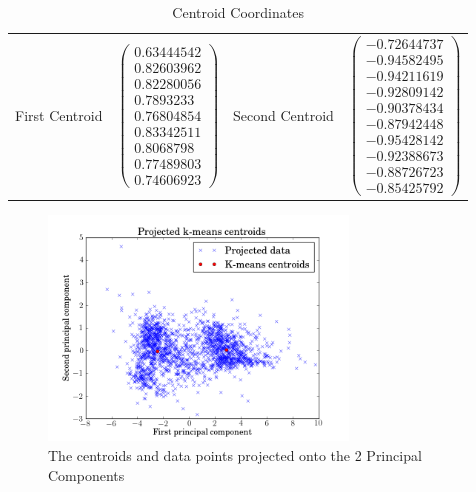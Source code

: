 \documentclass{article}
\theoremstyle{plain}
\theoremstyle{nonumberplain}
\begin{document}
\begin{table}[htb]
\centering
\caption{Centroid Coordinates}
\label{table:centroid}
\begin{tabular}{l|c||l|c}
	\hline \hline
	First Centroid & 
	$
	\begin{pmatrix}
		0.63444542 \\
		0.82603962 \\
		0.82280056 \\
		0.7893233 \\
		0.76804854 \\
		0.83342511 \\
		0.8068798 \\
		0.77489803 \\ 
		0.74606923 
	\end{pmatrix} $ 
	& Second Centroid & 
	$\begin{pmatrix}
		-0.72644737 \\
		-0.94582495 \\
		-0.94211619 \\
		-0.92809142 \\
		-0.90378434 \\
		-0.87942448 \\
		-0.95428142 \\
		-0.92388673 \\
		-0.88726723 \\
		-0.85425792
	\end{pmatrix}$
\end{tabular}
\end{table}

\begin{figure}[htb]
\centering
\includegraphics[height=6cm]{Images/Kmeans_PCA.png}
\caption{The centroids and data points projected onto the 2 Principal Components}
\label{fig:kmeans}
\end{figure}
\end{document}
